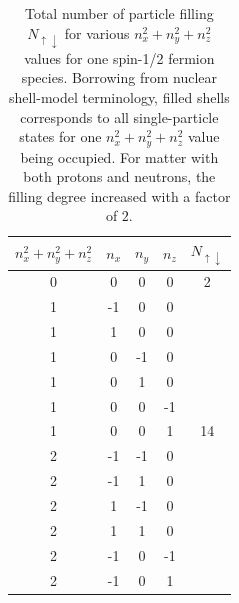\begin{table}
\begin{center}
\caption{Total number of particle filling $N_{\uparrow \downarrow }$ for various $n_{x}^{2}+n_{y}^{2}+n_{z}^{2}$ values for one spin-1/2 fermion species. 
Borrowing from nuclear shell-model terminology, filled shells corresponds to all single-particle states for one $n_{x}^{2}+n_{y}^{2}+n_{z}^{2}$ value
being occupied.  For matter with both protons and neutrons, the filling degree increased with a factor of $2$.} \label{tab:table1}  
\begin{tabular}{ccccc}
\hline
\multicolumn{1}{c}{ $n_{x}^{2}+n_{y}^{2}+n_{z}^{2}$ } & \multicolumn{1}{c}{ $n_{x}$ } & \multicolumn{1}{c}{ $n_{y}$ } & \multicolumn{1}{c}{ $n_{z}$ } & \multicolumn{1}{c}{ $N_{\uparrow \downarrow }$ } \\
\hline
0                               & 0       & 0       & 0       & 2                          \\
\hline
1                               & -1      & 0       & 0       &                            \\
1                               & 1       & 0       & 0       &                            \\
1                               & 0       & -1      & 0       &                            \\
1                               & 0       & 1       & 0       &                            \\
1                               & 0       & 0       & -1      &                            \\
1                               & 0       & 0       & 1       & 14                         \\
\hline
2                               & -1      & -1      & 0       &                            \\
2                               & -1      & 1       & 0       &                            \\
2                               & 1       & -1      & 0       &                            \\
2                               & 1       & 1       & 0       &                            \\
2                               & -1      & 0       & -1      &                            \\
2                               & -1      & 0       & 1       &                            \\

\end{tabular}
\end{center}
\end{table}
